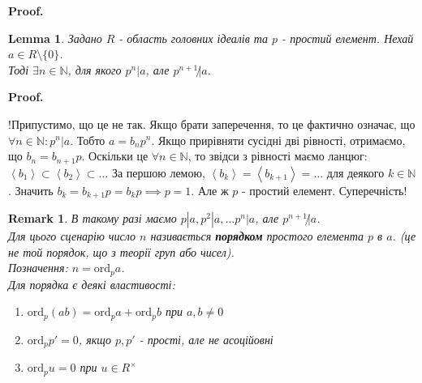 \documentclass[a4paper, 14pt]{extarticle}
\makeatletter
\theoremstyle{theoremdd}
\theoremstyle{theoremdd}
\theoremstyle{theoremdd}
\theoremstyle{theoremdd}
\theoremstyle{theoremdd}
\theoremstyle{theoremdd}
\newtheorem{remark}[theorem]{Remark}
\theoremstyle{theoremdd}
\newtheorem{lemma}[theorem]{Lemma}
\theoremstyle{theoremdd}
\def\qed{$\blacksquare$}
\renewenvironment{proof}[1][Proof.\\]{\par
\pushQED{\hfill \qed}%
\normalfont \topsep6\p@\@plus6\p@\relax
\trivlist
\item\relax
{\bfseries
#1\@addpunct{.}}\hspace\labelsep\ignorespaces
}{%
\popQED\endtrivlist\@endpefalse
}
\makeatother
\begin{document}
\begin{proof}
\begin{lemma}
Задано $R$ - область головних ідеалів та $p$ - простий елемент. Нехай $a \in R \setminus \{0\}$. \\
Тоді $\exists n \in \mathbb{N}$, для якого $p^n |a$, але $p^{n+1} \not| a$.
\end{lemma}

\begin{proof}
!Припустимо, що це не так. Якщо брати заперечення, то це фактично означає, що $\forall n \in \mathbb{N}: p^n |a$. Тобто $a = b_n p^n$. Якщо прирівняти сусідні дві рівності, отримаємо, що $b_n = b_{n+1}p$. Оскільки це $\forall n \in \mathbb{N}$, то звідси з рівності маємо ланцюг:\\
$\left< b_1 \right> \subset \left< b_2 \right> \subset \dots$ За першою лемою, $\left< b_k \right> = \left< b_{k+1} \right> = \dots$ для деякого $k \in \mathbb{N}$. Значить $b_k = b_{k+1}p = b_k p \implies p = 1$. Але ж $p$ - простий елемент. Суперечність!
\end{proof}

\begin{remark}
В такому разі маємо $p | a, p^2 | a, \dots p^n |a$, але $p^{n+1} \not| a$.\\
Для цього сценарію число $n$ називається \textbf{порядком} простого елемента $p$ в $a$. (це не той порядок, що з теорії груп або чисел).\\
Позначення: $n = \text{ord}_p a$.
\bigskip \\
Для порядка є деякі властивості:
\begin{enumerate}
\item $\text{ord}_p(ab) = \text{ord}_p a + \text{ord}_p b$ при $a,b \neq 0$
\item $\text{ord}_p p' = 0$, якщо $p,p'$ - прості, але не асоційовні
\item $\text{ord}_p u = 0$ при $u \in R^\times$
\end{enumerate}
\end{remark}


\end{proof}
\end{document}
